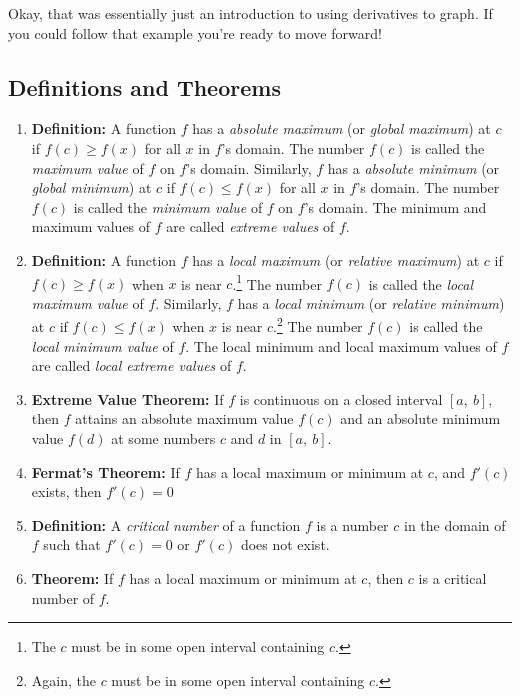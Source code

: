 \documentclass[12pt,addpoints, answers, fleqn]{exam}
\begin{document}
Okay, that was essentially just an introduction to using derivatives to graph. If you could follow that example you're ready to move forward!


\subsection{Definitions and Theorems}

\begin{enumerate}
\item \textbf{Definition:} A function $f$ has a \emph{absolute maximum} (or \emph{global maximum}) at $c$ if $f\left( c \right) \geq f\left( x \right)$ for all $x$ in $f$'s domain. The number $f\left(c\right)$ is called the \emph{maximum value} of $f$ on $f$'s domain. Similarly, $f$  has a \emph{absolute minimum} (or \emph{global minimum}) at $c$ if $f\left( c \right) \leq f\left( x \right)$ for all $x$ in $f$'s domain. The number $f\left(c\right)$ is called the \emph{minimum value} of $f$ on $f$'s domain. The minimum and maximum values of $f$ are called \emph{extreme values} of $f$.
\item \textbf{Definition:} A function $f$ has a \emph{local maximum} (or \emph{relative maximum}) at $c$ if $f\left( c \right) \geq f\left( x \right)$ when $x$ is near $c$.\footnote{The $c$ must be in some open interval containing $c$.} The number $f\left(c\right)$ is called the \emph{local maximum value} of $f$. Similarly, $f$  has a \emph{local minimum} (or \emph{relative minimum}) at $c$ if $f\left( c \right) \leq f\left( x \right)$ when $x$ is near $c$.\footnote{Again, the $c$ must be in some open interval containing $c$.} The number $f\left(c\right)$ is called the \emph{local minimum value} of $f$. The local minimum and local maximum values of $f$ are called \emph{local extreme values} of $f$.
\item \textbf{Extreme Value Theorem:} If $f$ is continuous on a closed interval $\left[ a, \ b \right]$, then $f$ attains an absolute maximum value $f\left(c\right)$ and an absolute minimum value $f\left(d\right)$ at some numbers $c$ and $d$ in $\left[ a, \ b \right]$.
\item \textbf{Fermat's Theorem:} If $f$ has a local maximum or minimum at $c$, and $f'\left(c\right)$ exists, then $f'\left(c\right)=0$
\item \textbf{Definition:} A \emph{critical number} of a function $f$ is a number $c$ in the domain of $f$ such that $f'\left(c\right)=0$ or $f'\left(c\right)$ does not exist.
\item \textbf{Theorem:} If $f$ has a local maximum or minimum at $c$, then $c$ is a critical number of $f$.

\end{enumerate}
\end{document}
